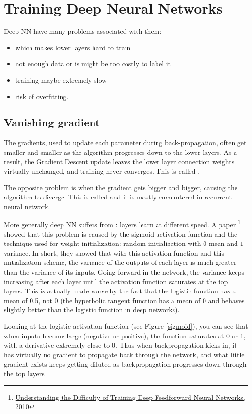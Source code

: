 \section{Training Deep Neural Networks}
Deep NN have many problems associated with them:
\begin{itemize}
\item {} which makes lower layers hard to train
\item not enough data or is might be too costly to label it
\item training maybe extremely slow
\item risk of overfitting.
\end{itemize}
\subsection{Vanishing gradient}
The gradients, used to update each parameter during back-propagation, often get smaller and smaller as the algorithm progresses down to the lower layers. As a result, the Gradient Descent update leaves the lower layer connection weights virtually unchanged, and training never converges. This is called .

The opposite problem is when the gradient gets bigger and bigger, causing the algorithm to diverge. This is called  and it is mostly encountered in recurrent neural network.

More generally deep NN suffers from : layers learn at different speed. A  paper  \footnote{\href{http://proceedings.mlr.press/v9/glorot10a/glorot10a.pdf}{Understanding the Difficulty of Training Deep Feedforward Neural Networks, 2010}} showed that this problem is caused by the sigmoid activation function and the technique used for weight initialization: random initialization with $0$ mean and $1$ variance. In short, they showed that with this activation function and this initialization scheme, the variance of the outputs of each layer is much greater than the variance of its inputs. Going forward in the network, the variance keeps increasing after each layer until the activation function saturates at the top layers. This is actually made worse by the fact that the logistic function has a mean of 0.5, not 0 (the hyperbolic tangent function has a mean of 0 and behaves slightly better than the logistic function in deep networks).

Looking at the logistic activation function (see Figure \autoref{sigmoid}), you can see that when inputs become large (negative or positive), the function saturates at 0 or 1, with a derivative extremely close to 0. Thus when backpropagation kicks in, it has virtually no gradient to propagate back through the network, and what little gradient exists keeps getting diluted as backpropagation progresses down through the top layers

